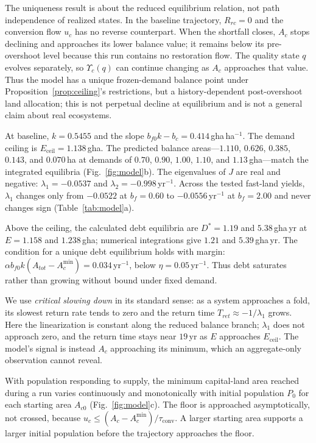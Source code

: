 \documentclass[preprint,12pt,authoryear]{elsarticle}
\newcommand{\Ups}{\Upsilon_c}
\newcommand{\Eceil}{E_{\mathrm{ceil}}}
\newcommand{\Acmin}{A_c^{\min}}
\newcommand{\tconv}{\tau_{\mathrm{conv}}}
\begin{document}
The uniqueness result is about the reduced equilibrium relation, not path independence of realized states. In the baseline trajectory, $R_{rc}=0$ and the conversion flow $u_c$ has no reverse counterpart. When the shortfall closes, $A_c$ stops declining and approaches its lower balance value; it remains below its pre-overshoot level because this run contains no restoration flow. The quality state $q$ evolves separately, so $\Ups(q)$ can continue changing as $A_c$ approaches that value. Thus the model has a unique frozen-demand balance point under Proposition~\ref{prop:ceiling}'s restrictions, but a history-dependent post-overshoot land allocation; this is not perpetual decline at equilibrium and is not a general claim about real ecosystems.

At baseline, $k=0.5455$ and the slope $b_{f0}k-b_c=0.414$\,gha\,ha$^{-1}$. The demand ceiling is $\Eceil=1.138$\,gha. The predicted balance areas—$1.110$, $0.626$, $0.385$, $0.143$, and $0.070$\,ha at demands of $0.70$, $0.90$, $1.00$, $1.10$, and $1.13$\,gha—match the integrated equilibria (Fig.~\ref{fig:model}b). The eigenvalues of $J$ are real and negative: $\lambda_1=-0.0537$ and $\lambda_2=-0.998$\,yr$^{-1}$. Across the tested fast-land yields, $\lambda_1$ changes only from $-0.0522$ at $b_f=0.60$ to $-0.0556$\,yr$^{-1}$ at $b_f=2.00$ and never changes sign (Table~\ref{tab:model}a).

Above the ceiling, the calculated debt equilibria are $D^*=1.19$ and $5.38$\,gha\,yr at $E=1.158$ and $1.238$\,gha; numerical integrations give $1.21$ and $5.39$\,gha\,yr. The condition for a unique debt equilibrium holds with margin: $\alpha b_{f0}k(A_{tot}-\Acmin)=0.034$\,yr$^{-1}$, below $\eta=0.05$\,yr$^{-1}$. Thus debt saturates rather than growing without bound under fixed demand.

We use \emph{critical slowing down} in its standard sense: as a system approaches a fold, its slowest return rate tends to zero and the return time $T_{ret}\approx-1/\lambda_1$ grows. Here the linearization is constant along the reduced balance branch; $\lambda_1$ does not approach zero, and the return time stays near $19$\,yr as $E$ approaches $\Eceil$. The model's signal is instead $A_c$ approaching its minimum, which an aggregate-only observation cannot reveal.

With population responding to supply, the minimum capital-land area reached during a run varies continuously and monotonically with initial population $P_0$ for each starting area $A_{c0}$ (Fig.~\ref{fig:model}c). The floor is approached asymptotically, not crossed, because $u_c\le(A_c-\Acmin)/\tconv$. A larger starting area supports a larger initial population before the trajectory approaches the floor.
\end{document}
